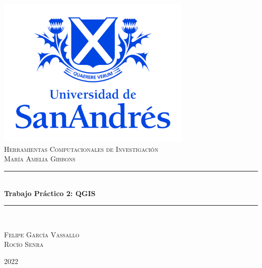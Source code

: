 \documentclass[11pt]{article}
\begin{document}
\begin{titlepage} %
	\newcommand{\HRule}{\rule{\linewidth}{0.5mm}} %
	
	\center %
	
	\includegraphics[width=0.7\textwidth]{Airbnb/logoudesa}\\[0.8cm]
	\textsc{\LARGE Herramientas Computacionales de Investigación}\\[0.5cm] %
	
	\textsc{\Large María Amelia Gibbons}\\
	\vspace{4pt}
	\textcolor{white}{\HRule}\\[0.6cm]
	\huge\bfseries Trabajo Práctico 2: QGIS 
	\textcolor{white}{\HRule}\\[1.5cm]
	\begin{center}
		\Large
		\textsc{Felipe García Vassallo\\
		        Rocío Senra}\\
	\end{center}
	
	
	\vfill\vfill\vfill %
	{\large 2022}
	\vfill
	
\end{titlepage}
\end{document}
